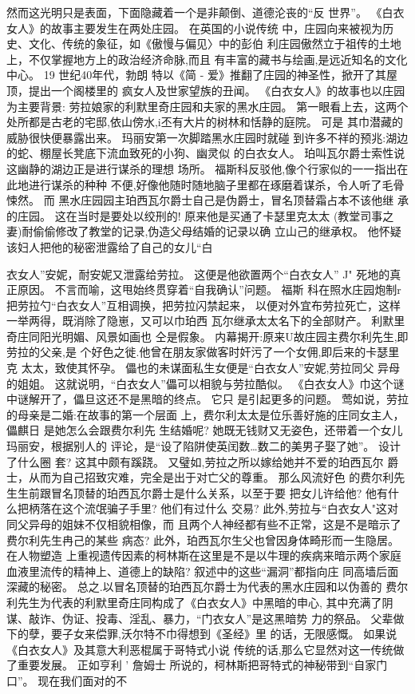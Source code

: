 \documentclass[a4paper]{article}
\begin{document}
然而这光明只是表面，下面隐藏着一个是非颠倒、道德沦丧的“反
世界”。 《白衣女人》的故事主要发生在两处庄园。 在英国的小说传统
中，庄园向来被视为历史、文化、传统的象征，如《傲慢与偏见〉中的彭伯
利庄园傲然立于祖传的土地上，不仅掌握地方上的政治经济命脉,而且
有丰富的藏书与绘画,是远近知名的文化中心。 19 世纪40年代，勃朗
特以《简 - 爱》推翻了庄园的神圣性，掀开了其屋顶，提出一个阁楼里的
疯女人及世家望族的丑闻。 《白衣女人》的故事也以庄园为主要背景:
劳拉娘家的利默里奇庄园和夫家的黑水庄园。 第一眼看上去，这两个
处所都是古老的宅邸,依山傍水,i丕有大片的树林和恬静的庭院。 可是
其巾潜藏的威胁很快便暴露出来。 玛丽安第一次脚踏黑水庄园时就碰
到许多不祥的预兆:湖边的蛇、棚屋长凳底下流血致死的小狗、幽灵似
的白衣女人。 珀叫瓦尔爵士索性说这幽静的湖边正是进行谋杀的理想
场所。 福斯科反驳他,像个行家似的一一指出在此地进行谋杀的种种
不便,好像他随时随地脑子里都在琢磨着谋杀，令人听了毛骨悚然。 而
黑水庄园园主珀西瓦尔爵士自己是伪爵士，冒名顶替霜占本不该他继
承的庄园。 这在当时是要处以绞刑的! 原来他是买通了卡瑟里克太太
(教堂司事之妻)耐偷偷修改了教堂的记录,伪造父母结婚的记录以确
立山己的继承权。 他怀疑该妇人把他的秘密泄露给了自己的女儿“白

衣女人”安妮，耐安妮又泄露给劳拉。 这便是他欲置两个“白衣女人” J"
死地的真正原因。 不言而喻，这甩始终贯穿着“自我确认”问题。 福斯
科在照水庄园炮制r把劳拉勺“白衣女人”互相调换，把劳拉闪禁起来，
以便对外宜布劳拉死亡，这样一举两得，既消除了隐崽，又可以巾珀西
瓦尔继承太太名下的全部财产。 利默里奇庄同阳光明媚、风景如画也
仝是假象。 内幕揭开:原来U故庄园主费尔利先生,即劳拉的父亲,是
个好色之徙.他曾在朋友家做客时奸污了一个女佣,即后来的卡瑟里克
太太，致使其怀孕。 儡也的未谋面私生女便是“白衣女人”安妮,劳拉同父
异母的姐姐。 这就说明，“白衣女人”儡可以相貌与劳拉酷似。
《白衣女人》巾这个谜中谜解开了，儡旦这还不是黑暗的终点。 它只
是引起更多的问题。 莺如说，劳拉的母亲是二婚:在故事的第一个层面
上，费尔利太太是位乐善好施的庄同女主人，儡麒日 是她怎么会跟费尔利先
生结婚呢? 她既无钱财又无姿色，还带着一个女儿玛丽安，根据别人的
评论，是“设了陷阱使英闰数…数二的美男子娶了她”。 设计了什么圈
套? 这其中颇有蹊跷。 又璧如,劳拉之所以嫁给她并不爱的珀西瓦尔
爵士，从而为自己招致灾难，完全是出于对亡父的尊重。 那么风流好色
的费尔利先生生前跟冒名顶替的珀西瓦尔爵士是什么关系，以至于要
把女儿许给他? 他有什么把柄落在这个流氓骗子手里? 他们有过什么
交易? 此外,劳拉与“白衣女人"这对同父异母的姐妹不仅相貌相像，而
且两个人神经都有些不正常，这是不是暗示了费尔利先生冉己的某些
病态? 此外，珀西瓦尔生父也曾因身体畸形而一生隐居。 在人物塑造
上重视遗传因素的柯林斯在这里是不是以牛理的疾病来暗示两个家庭
血液里流传的精神上、道德上的缺陷? 叙述中的这些“漏洞”都指向庄
同高墙后面深藏的秘密。
总之.以冒名顶替的珀西瓦尔爵士为代表的黑水庄园和以伪善的
费尔利先生为代表的利默里奇庄同构成了《白衣女人》中黑暗的申心,
其中充满了阴谋、敲诈、伪证、投毒、淫乱、暴力，“门衣女人”是这黑暗势
力的祭品。 父辈做下的孽，要子女来偿罪,沃尔特不巾得想到《圣经》里
的话，无限感慨。 如果说《白衣女人》及其意大利恶棍属于哥特式小说
传统的话,那么它显然对这一传统做了重要发展。 正如亨利 ' 詹姆士
所说的，柯林斯把哥特式的神秘带到“自家门口”。 现在我们面对的不
\end{document}

